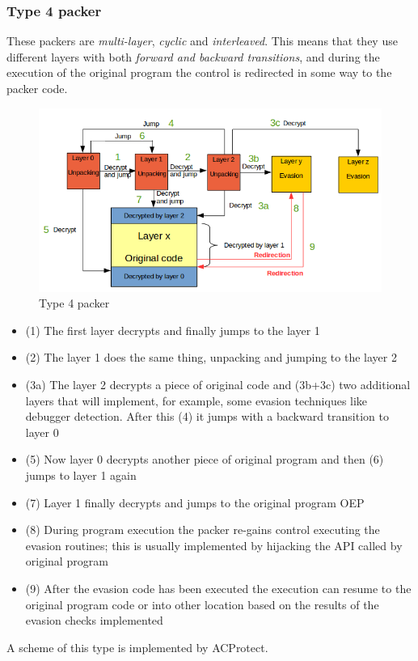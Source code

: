 \subsubsection{Type 4 packer}
These packers are \textit{multi-layer}, \textit{cyclic} and \textit{interleaved}. This means that they use different layers with both \textit{forward and backward transitions}, and during the execution of the original program the control is redirected in some way to the packer code.
\begin{figure}[!ht]
	\begin{center}
   		\includegraphics[width=\textwidth]{pictures/packer_type_4.png} 
	\end{center}
	\caption{Type 4 packer}
\end{figure}
\begin{itemize}
\item (1) The first layer decrypts and finally jumps to the layer 1
\item (2) The layer 1 does the same thing, unpacking and jumping to the layer 2
\item (3a) The layer 2 decrypts a piece of original code and (3b+3c) two additional layers that will implement, for example, some evasion techniques like debugger detection. After this (4) it jumps with a backward transition to layer 0
\item (5) Now layer 0 decrypts another piece of original program and then (6) jumps to layer 1 again
\item (7) Layer 1 finally decrypts and jumps to the original program \ac{OEP}
\item (8) During program execution the packer re-gains control executing the evasion routines; this is usually implemented by hijacking the \ac{API} called by original program
\item (9) After the evasion code has been executed the execution can resume to the original program code or into other location based on the results of the evasion checks implemented
\end{itemize}
A scheme of this type is implemented by ACProtect.

